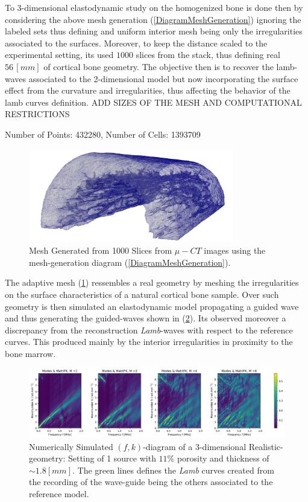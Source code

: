 To 3-dimensional elastodynamic study on the homogenized bone is done then by considering the above mesh generation (\ref{DiagramMeshGeneration}) ignoring the labeled sets thus defining and uniform interior mesh being only the irregularities associated to the surfaces.
Moreover, to keep the distance scaled to the experimental setting, its used $1000$ slices from the stack, thus defining real $56 \, [mm]$ of cortical bone geometry.
The objective then is to recover the lamb-waves associated to the 2-dimensional model but now incorporating the surface effect from the curvature and irregularities, thus affecting the behavior of the lamb curves definition.
ADD SIZES OF THE MESH AND COMPUTATIONAL RESTRICTIONS

Number of Points: 432280, Number of Cells: 1393709

\begin{figure}[!h]
	\centering
	\includegraphics[width=0.8\textwidth]{images/ImgExt/CorticalBoneS1000OPT20-View.png}
	\caption{Mesh Generated from 1000 Slices from $\mu-CT$ images using the mesh-generation diagram (\ref{DiagramMeshGeneration}).}
	\label{HomBoneMeshFile}
\end{figure} 

The adaptive mesh (\ref{HomBoneMeshFile}) ressembles a real geometry by meshing the irregularities on the surface characteristics of a natural cortical bone sample. Over such geometry is then simulated an elastodynamic model propagating a guided wave and thus generating the guided-waves shown in (\ref{FK-HomBone-DiagramS1P11M18}).
Its observed moreover a discrepancy from the reconstruction \textit{Lamb}-waves with respect to the reference curves. This produced mainly by the interior irregularities in proximity to the bone marrow.

\begin{figure}[!h]
	\centering
	\includegraphics[width=\textwidth]{images/ClusterSim/3DCorticalS1000TimeP11TransIsoFKW18.png}
	\caption{Numerically Simulated $(f,k)$-diagram of a 3-dimensional Realistic-geometry: Setting of 1 source with $11\%$ porosity and thickness of $\sim 1.8 [mm]$. The green lines defines the \textit{Lamb} curves created from the recording of the wave-guide being the others associated to the reference model.}
	\label{FK-HomBone-DiagramS1P11M18}
\end{figure} 


